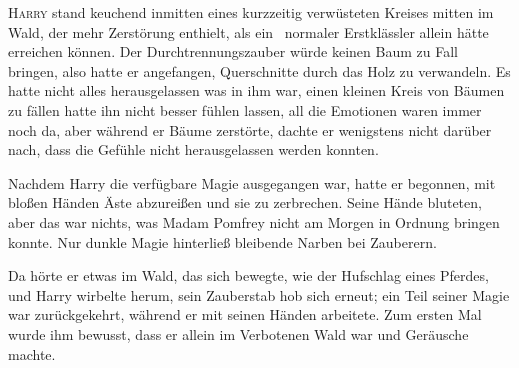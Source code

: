 
\lettrine{H}{arry} stand keuchend inmitten eines kurzzeitig verwüsteten Kreises mitten im Wald, der mehr Zerstörung enthielt, als ein ~normaler Erstklässler allein hätte erreichen können.
Der Durchtrennungszauber würde keinen Baum zu Fall bringen, also hatte er angefangen, Querschnitte durch das Holz zu verwandeln. Es hatte nicht alles herausgelassen was in ihm war, einen kleinen Kreis von Bäumen zu fällen hatte ihn nicht besser fühlen lassen, all die Emotionen waren immer noch da, aber während er Bäume zerstörte, dachte er wenigstens nicht darüber nach, dass die Gefühle nicht herausgelassen werden konnten.

Nachdem Harry die verfügbare Magie ausgegangen war, hatte er begonnen, mit bloßen Händen Äste abzureißen und sie zu zerbrechen. Seine Hände bluteten, aber das war nichts, was Madam Pomfrey nicht am Morgen in Ordnung bringen konnte. Nur dunkle Magie hinterließ bleibende Narben bei Zauberern.

Da hörte er etwas im Wald, das sich bewegte, wie der Hufschlag eines Pferdes, und Harry wirbelte herum, sein Zauberstab hob sich erneut; ein Teil seiner Magie war zurückgekehrt, während er mit seinen Händen arbeitete. Zum ersten Mal wurde ihm bewusst, dass er allein im Verbotenen Wald war und Geräusche machte.

